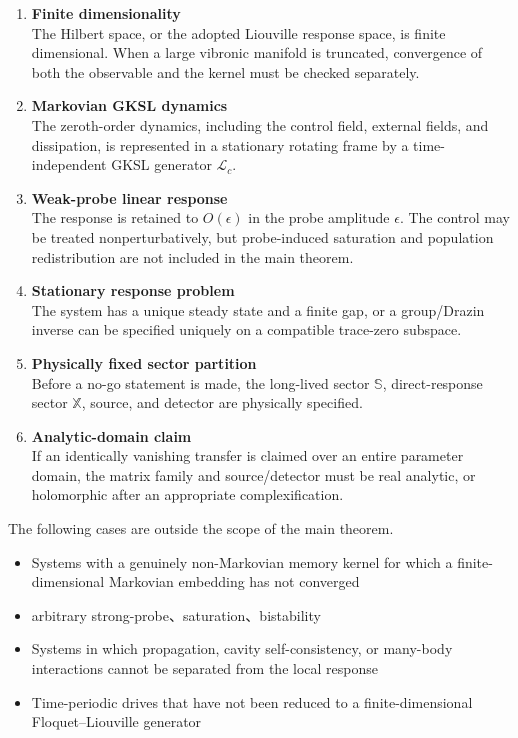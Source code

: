 \documentclass[
  10pt,
  a4paper,
]{article}
\providecommand{\tightlist}{%
  \setlength{\itemsep}{0pt}\setlength{\parskip}{0pt}}
\begin{document}
\begin{enumerate}
\def\labelenumi{\arabic{enumi}.}
\tightlist
\item
  \textbf{Finite dimensionality}\\
  The Hilbert space, or the adopted Liouville response space, is finite
  dimensional. When a large vibronic manifold is truncated, convergence
  of both the observable and the kernel must be checked separately.
\item
  \textbf{Markovian GKSL dynamics}\\
  The zeroth-order dynamics, including the control field, external
  fields, and dissipation, is represented in a stationary rotating frame
  by a time-independent GKSL generator \(\mathcal L_c\).
\item
  \textbf{Weak-probe linear response}\\
  The response is retained to \(O(\epsilon)\) in the probe amplitude
  \(\epsilon\). The control may be treated nonperturbatively, but
  probe-induced saturation and population redistribution are not
  included in the main theorem.
\item
  \textbf{Stationary response problem}\\
  The system has a unique steady state and a finite gap, or a
  group/Drazin inverse can be specified uniquely on a compatible
  trace-zero subspace.
\item
  \textbf{Physically fixed sector partition}\\
  Before a no-go statement is made, the long-lived sector \(\mathbb S\),
  direct-response sector \(\mathbb X\), source, and detector are
  physically specified.
\item
  \textbf{Analytic-domain claim}\\
  If an identically vanishing transfer is claimed over an entire
  parameter domain, the matrix family and source/detector must be real
  analytic, or holomorphic after an appropriate complexification.
\end{enumerate}

The following cases are outside the scope of the main theorem.

\begin{itemize}
\tightlist
\item
  Systems with a genuinely non-Markovian memory kernel for which a
  finite-dimensional Markovian embedding has not converged
\item
  arbitrary strong-probe、saturation、bistability
\item
  Systems in which propagation, cavity self-consistency, or many-body
  interactions cannot be separated from the local response
\item
  Time-periodic drives that have not been reduced to a
  finite-dimensional Floquet--Liouville generator
\end{itemize}
\end{document}
